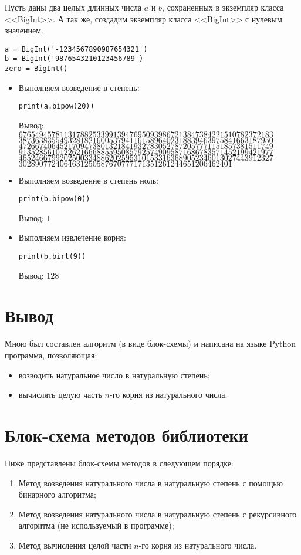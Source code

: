 Пусть даны два целых длинных числа $a$ и $b$, сохраненных в экземпляр класса <<BigInt>>.
А так же, создадим экземпляр класса <<BigInt>> с нулевым значением.
    \begin{lstlisting}
a = BigInt('-1234567890987654321')
b = BigInt('9876543210123456789')
zero = BigInt()\end{lstlisting}

    \begin{itemize}
        \item Выполняем возведение в степень:
        \begin{lstlisting}
print(a.bipow(20))\end{lstlisting}
        Вывод:\\
        $67654945781131788253399139476950939867213847384221510782372183$
        $38736383554932818216005379411615896402318839463975841663187950$
        $47266740645217094738013218419327830527872057771151857381511749$
        $91352856101226216668855950857925749095871686783571452199421977$
        $46524667992025003348862025953101533163689052346013027443912327$
        $3028907724064631250587670777171351261244651206462401$
        \item Выполняем возведение в степень ноль:
        \begin{lstlisting}
print(b.bipow(0))\end{lstlisting}
        Вывод: $1$
        \item Выполняем извлечение корня:
        \begin{lstlisting}
print(b.birt(9))\end{lstlisting}
        Вывод: $128$
    \end{itemize}

\clearpage
\section{Вывод}
Мною был составлен алгоритм (в виде блок-схемы) и написана на языке Python программа, позволяющая:
\begin{itemize}
    \item возводить натуральное число в натуральную степень;
    \item вычислять целую часть $n$-го корня из натурального числа.
\end{itemize}

\clearpage
\section{Блок-схема методов библиотеки}
Ниже представлены блок-схемы методов в следующем порядке:
\begin{enumerate}
    \item Метод возведения натурального числа в натуральную степень с помощью бинарного алгоритма;
    \item Метод возведения натурального числа в натуральную степень с рекурсивного алгоритма (не используемый в программе);
    \item Метод вычисления целой части $n$-го корня из натурального числа.
\end{enumerate}

